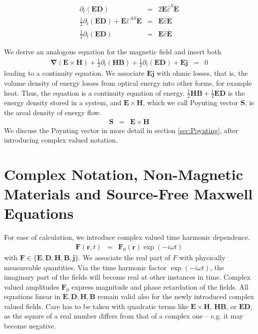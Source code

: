 \documentclass[12pt,a4paper,twoside,openright,BCOR10mm,headsepline,titlepage,abstracton,chapterprefix,final]{scrreprt}
\newcommand\Vector[1]{{\mathbf{#1}}}
\newcommand\Nabla{\Vector{\nabla}}
\newcommand\timederivative[1]{\dot{{#1}}}
\newcommand\Tensor[1]{\hat{#1}}
\newcommand\scalarEfield{E}
\newcommand\scalarBfield{B}
\newcommand\scalarHfield{H}
\newcommand\scalarDfield{D}
\newcommand\Efield{\Vector{\scalarEfield}}
\newcommand\Bfield{\Vector{\scalarBfield}}
\newcommand\Hfield{\Vector{\scalarHfield}}
\newcommand\Dfield{\Vector{\scalarDfield}}
\newcommand\permittivity{\Tensor{\scalarpermittivity}}
\newcommand\scalarpermittivity{\varepsilon}
\newcommand\currentdensity{\Vector{j}}
\begin{document}
\begin{eqnarray}
 \partial_t (\Efield \Dfield)                                                                  &=& 2 \Efield \permittivity^S \timederivative{\Efield} \\
 \frac{1}{2} \partial_t (\Efield \Dfield)+ \Efield \permittivity^{AS} \timederivative{\Efield} &=&   \Efield  \permittivity \timederivative{\Efield} \\
 \frac{1}{2} \partial_t (\Efield \Dfield)                                                      &=&   \Efield  \permittivity \timederivative{\Efield}
\end{eqnarray}

We derive an analogous equation for the magnetic field and insert both
\begin{eqnarray}
   \Nabla ( \Efield \times \Hfield ) + \frac{1}{2} \partial_t (\Hfield \Bfield) + \frac{1}{2} \partial_t (\Efield \Dfield) + \Efield \currentdensity &=& 0
\end{eqnarray}
leading to a continuity equation. 
We associate $\Efield \currentdensity$ with ohmic losses, that is, the volume density of energy losses from optical energy into other forms, for example heat.
Thus, the equation is a continuity equation of energy.
$\frac{1}{2} \Hfield \Bfield + \frac{1}{2} \Efield \Dfield$ is the energy density stored in a system, 
and $\Efield \times \Hfield$, which we call Poynting vector $\Vector{S}$, is the areal density of energy flow.
\begin{eqnarray}
 \Vector{S} &=& \Efield \times \Hfield
 \label{eq:definitionOfPoynting}
\end{eqnarray}
We discuss the Poynting vector in more detail in section \ref{sec:Poynting}, after introducing complex valued notation.

\section{Complex Notation, Non-Magnetic Materials and Source-Free Maxwell Equations}
\label{sec:sourcefreemaxwell}
For ease of calculation, we introduce complex valued time harmonic dependence.
\begin{eqnarray}
 \Vector{F}(\Vector{r},t) &=& \Vector{F}_0(\Vector{r}) \exp(-i \omega t)
\end{eqnarray}
with $\Vector{F} \in \{ \Efield, \Dfield, \Hfield, \Bfield, \currentdensity \}$.
We associate the real part of $F$ with physically measureable quantities. 
Via the time harmonic factor $\exp(-i \omega t)$, the imaginary part of the fields will become real at other instances in time.
Complex valued amplitudes $\Vector{F}_0$ express magnitude and phase retardation of the fields.
All equations linear in $\Efield,\Dfield,\Hfield,\Bfield$ remain valid also for the newly introduced complex valued fields.
Care has to be taken with quadratic terms like $\Efield \times \Hfield$, $\Hfield \Bfield$, or $\Efield \Dfield$,
as the square of a real number differs from that of a complex one -- e.g. it may become negative.
\end{document}
